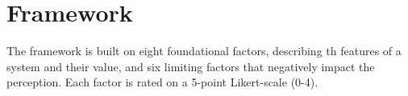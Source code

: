 \newpage
\section{Framework}

The framework is built on eight foundational factors, describing th features of a system and their value, and six limiting factors that negatively impact the perception. Each factor is rated on a 5-point Likert-scale (0-4).

